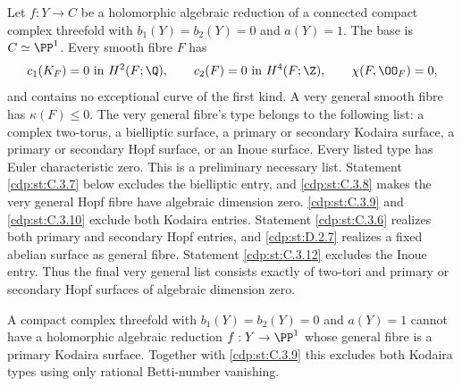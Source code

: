 \begin{proposition}\label{cdp:st:C.3.1}

Let $f:Y\to C$ be a holomorphic algebraic reduction of a connected
compact complex threefold with $b_1(Y)=b_2(Y)=0$ and $a(Y)=1$.
The base is $C\simeq\PP^1$. Every smooth fibre $F$ has
\[
 c_1(K_F)=0\text{ in }H^2(F;\Q),\qquad
 c_2(F)=0\text{ in }H^4(F;\Z),\qquad
 \chi(F,\OO_F)=0,
\]
and contains no exceptional curve of the first kind. A very general
smooth fibre has $\kappa(F)\leq0$. The very general fibre's type belongs to the following
list: a complex two-torus, a bielliptic surface, a primary or secondary
Kodaira surface, a primary or secondary Hopf surface, or an Inoue
surface. Every listed type has Euler characteristic zero. This is a
preliminary necessary list. Statement \ref{cdp:st:C.3.7} below excludes the
bielliptic entry, and \ref{cdp:st:C.3.8} makes the very general Hopf fibre have
algebraic dimension zero. \ref{cdp:st:C.3.9} and \ref{cdp:st:C.3.10} exclude both Kodaira
entries. Statement \ref{cdp:st:C.3.6} realizes both primary and secondary Hopf
entries, and \ref{cdp:st:D.2.7} realizes a fixed abelian surface as general
fibre. Statement \ref{cdp:st:C.3.12} excludes the Inoue entry. Thus the
final very general list consists exactly of two-tori and
primary or secondary Hopf surfaces of algebraic dimension zero.
\end{proposition}

\begin{proposition}\label{cdp:st:C.3.10}


A compact complex threefold with $b_1(Y)=b_2(Y)=0$ and
$a(Y)=1$ cannot have a holomorphic algebraic reduction
$f:Y\to\PP^1$ whose general fibre is a primary Kodaira
surface. Together with \ref{cdp:st:C.3.9} this excludes both Kodaira
types using only rational Betti-number vanishing.
\end{proposition}

